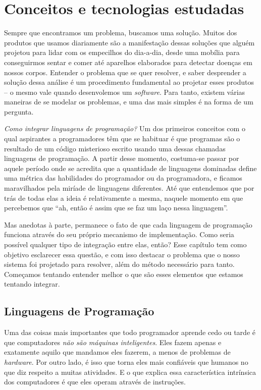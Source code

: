 
\chapter{Conceitos e tecnologias estudadas}
\label{cap:conceitos}
  Sempre que encontramos um problema, buscamos uma solução. Muitos dos produtos
  que usamos diariamente são a manifestação dessas soluções que alguém projetou
  para lidar com os empecilhos do dia-a-dia, desde uma mobília para conseguirmos
  sentar e comer até aparelhos elaborados para detectar doenças em nossos
  corpos. Entender o problema que se quer resolver, e saber desprender a solução
  dessa análise é um procedimento fundamental ao projetar esses produtos -- o
  mesmo vale quando desenvolemos um \textit{software}. Para tanto, existem
  várias maneiras de se modelar os problemas, e uma das mais simples é na forma
  de um pergunta.

  \emph{Como integrar linguagens de programação?} Um dos primeiros
  conceitos com o qual aspirantes a programadores têm que se habituar é que
  programas são o resultado de um código misterioso escrito usando uma dessas
  chamadas linguagens de programação. A partir desse momento, costuma-se passar
  por aquele período onde se acredita que a quantidade de linguagens dominadas
  define uma métrica das habilidades do programador ou da programadora, e
  ficamos maravilhados pela miríade de linguagens diferentes. Até que entendemos
  que por trás de todas elas a ideia é relativamente a mesma, naquele momento em
  que percebemos que ``ah, então é assim que se faz um laço nessa linguagem''.
  
  Mas anedotas à parte, permanece o fato de que cada linguagem de programação
  funciona através do seu próprio mecanismo de implementação. Como seria
  possível qualquer tipo de integração entre elas, então? Esse capítulo tem
  como objetivo esclarecer essa questão, e com isso destacar o problema que
  o nosso sistema foi projetado para resolver, além do método necessário para
  tanto. Começamos tentando entender melhor o que são esses elementos que
  estamos tentando integrar.

  \section{Linguagens de Programação}
  \label{cap:conceitos:linguagens}
  Uma das coisas mais importantes que todo programador aprende cedo ou tarde é
  que computadores \emph{não são máquinas inteligentes}. Eles fazem apenas e
  exatamente aquilo que mandamos eles fazerem, a menos de problemas de
  \textit{hardware}. Por outro lado, é isso que torna eles mais confiáveis que
  humanos no que diz respeito a muitas atividades. E o que explica essa
  característica intrínsica dos computadores é que eles operam através de
  instruções.

